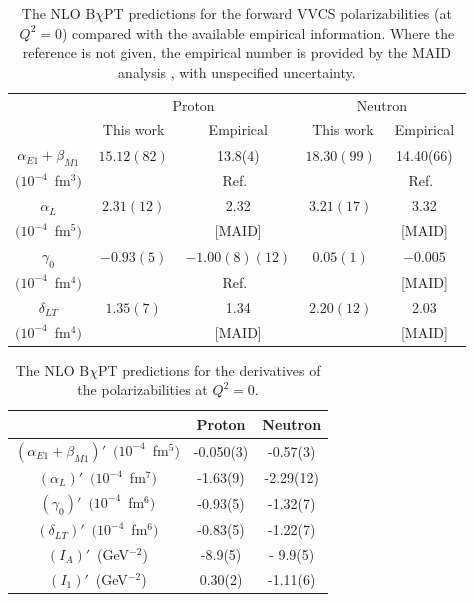 \documentclass[prc,twocolumn,showpacs,preprintnumbers,amsmath,amssymb
,superscriptaddress,a4paper,nofootinbib
]{revtex4-1}
\begin{document}
\begin{table}[tb]
\begin{tabular}{c|c|c||c|c|}
\cline{2-5} 
&  \multicolumn{2}{|c||}{ Proton} & 
\multicolumn{2}{|c|}{Neutron} \\
\cline{2-5} 
  & \, This work \, & Empirical   & \, This work\, & \,\,Empirical\,\, \\
\hline
\multicolumn{1}{|c|}{$\alpha_{E1}+\beta_{M1}$} &$15.12(82)$ & 13.8(4) &$18.30(99)$  &14.40(66)\\
\multicolumn{1}{|c|}{$(10^{-4}$~fm$^3)$} & & Ref.~\cite{OlmosdeLeon:2001zn}& &Ref.~\cite{Babusci:1997ij}\\
\hline
\multicolumn{1}{|c|}{$\alpha_L$} &$2.31(12)$ & 2.32 & $3.21(17)$  & 3.32\\
\multicolumn{1}{|c|}{$(10^{-4}$~fm$^5)$} &&[MAID]&&[MAID]\\
\hline
\multicolumn{1}{|c|}{$\,\gamma_0 \,$} & $-0.93(5)$ &$-1.00(8)(12) $ &$0.05(1)$ & $-0.005$ \\
\multicolumn{1}{|c|}{$(10^{-4}$~fm$^4)$} &   &Ref.~\cite{Dutz:2003mm}&& [MAID]\\
\hline
\multicolumn{1}{|c|}{$\delta_{LT}$} & $1.35(7)$  & 1.34& $2.20(12)$ & 2.03\\
\multicolumn{1}{|c|}{$(10^{-4}$~fm$^4)$} &&[MAID]&&[MAID]\\
\hline
\end{tabular}
\caption{The NLO B$\chi$PT predictions for the forward VVCS polarizabilities (at $Q^2=0$)
compared with the available empirical information. Where the reference is
not given, the empirical number is provided by the MAID analysis \cite{Drechsel:2000ct,Drechsel:2007if}, with unspecified uncertainty.
\label{Table:Results-Pol}}
\end{table}



\begin{table}[tb]
\begin{tabular}{c|c||c|}
\cline{2-3} 
&  \multicolumn{1}{|c||}{ Proton} & 
\multicolumn{1}{|c|}{Neutron} \\
\hline
\multicolumn{1}{|c|}{$(\alpha_{E1}+\beta_{M1})'$~$(10^{-4}$~fm$^5)$} & -0.050(3)   & -0.57(3) \\
\hline
\multicolumn{1}{|c|}{$(\alpha_L)'$~$(10^{-4}$~fm$^7)$} &-1.63(9)  & -2.29(12)   \\
\hline
\multicolumn{1}{|c|}{$(\gamma_0)'$~$(10^{-4}$~fm$^6)$} & -0.93(5)& -1.32(7)   \\
\hline
\multicolumn{1}{|c|}{$(\delta_{LT})'$~$(10^{-4}$~fm$^6)$} &  -0.83(5) &  -1.22(7)  \\
\hline
\multicolumn{1}{|c|}{$(I_{A})'$~(GeV$^{-2}$)} & -8.9(5) &  - 9.9(5)  \\
\hline
\multicolumn{1}{|c|}{$(I_{1})'$~(GeV$^{-2}$)} &  0.30(2) &-1.11(6)  \\
\hline
\end{tabular}
\caption{The NLO B$\chi$PT predictions for the derivatives of the polarizabilities at $Q^2=0$.
\label{Table:Results-DerPol}}
\end{table}
\end{document}
